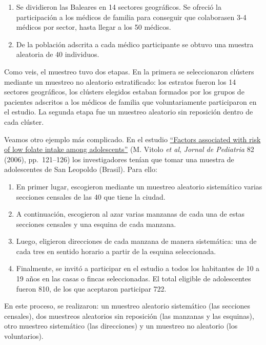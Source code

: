\documentclass[
]{book}
\providecommand{\tightlist}{%
  \setlength{\itemsep}{0pt}\setlength{\parskip}{0pt}}
\theoremstyle{definition}
\theoremstyle{definition}
\theoremstyle{definition}
\theoremstyle{definition}
\theoremstyle{remark}
\begin{document}
\begin{enumerate}
\def\labelenumi{\arabic{enumi}.}
\item
  Se dividieron las Baleares en 14 sectores geográficos. Se ofreció la participación a los médicos de familia para conseguir que colaborasen 3-4 médicos por sector, hasta llegar a los 50 médicos.
\item
  De la población adscrita a cada médico participante se obtuvo una muestra aleatoria de 40 individuos.
\end{enumerate}

Como veis, el muestreo tuvo dos etapas. En la primera se seleccionaron clústers mediante un muestreo no aleatorio estratificado: los estratos fueron los 14 sectores geográficos, los clústers elegidos estaban formados por los grupos de pacientes adscritos a los médicos de familia que voluntariamente participaron en el estudio. La segunda etapa fue un muestreo aleatorio sin reposición dentro de cada clúster.

Veamos otro ejemplo más complicado. En el estudio \href{https://www.scielo.br/pdf/jped/v82n2/en_v82n2a08.pdf}{``Factors associated with risk of low folate intake among adolescents''} (M. Vitolo \emph{et al}, \emph{Jornal de Pediatria} 82 (2006), pp.~121--126)
los investigadores tenían que tomar una muestra de adolescentes de San Leopoldo (Brasil). Para ello:

\begin{enumerate}
\def\labelenumi{\arabic{enumi}.}
\tightlist
\item
  En primer lugar, escogieron mediante un muestreo aleatorio sistemático varias secciones censales de las 40 que tiene la ciudad.
\item
  A continuación, escogieron al azar varias manzanas de cada una de estas secciones censales y una esquina de cada manzana.
\item
  Luego, eligieron direcciones de cada manzana de manera sistemática: una de cada tres en sentido horario a partir de la esquina seleccionada.
\item
  Finalmente, se invitó a participar en el estudio a todos los habitantes de 10 a 19 años en las casas o fincas seleccionadas. El total eligible de adolescentes fueron 810, de los que aceptaron participar 722.
\end{enumerate}

En este proceso, se realizaron: un muestreo aleatorio sistemático (las secciones censales), dos muestreos aleatorios sin reposición (las manzanas y las esquinas), otro muestreo sistemático (las direcciones) y un muestreo no aleatorio (los voluntarios).
\end{document}
